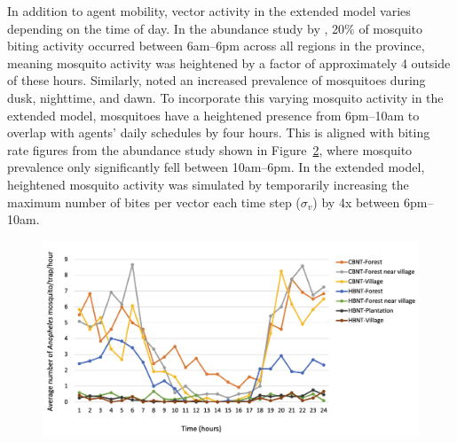 \begin{figure}[hbt!]
     \centering
    \label{fig:extended-model-scheduling}
\end{figure}

In addition to agent mobility, vector activity in the extended model varies depending on the time of day. In the abundance study by \citet{sandfort_forest_2020}, 20\% of mosquito biting activity occurred between 6am--6pm across all regions in the province, meaning mosquito activity was heightened by a factor of approximately 4 outside of these hours. Similarly, \citet{pepey_mobility_2022} noted an increased prevalence of mosquitoes during dusk, nighttime, and dawn. To incorporate this varying mosquito activity in the extended model, mosquitoes have a heightened presence from 6pm--10am to overlap with agents' daily schedules by four hours. This is aligned with biting rate figures from the abundance study shown in Figure~\ref{ch4:biting-rate-abundance}, where mosquito prevalence only significantly fell between 10am--6pm. In the extended model, heightened mosquito activity was simulated by temporarily increasing the maximum number of bites per vector each time step ($\sigma_v$) by 4x between 6pm--10am.


\begin{figure}[hbt!]
     \centering
     \includegraphics[width=1.1\textwidth]{figures/ch4/vantuax_fig2.png}
    \label{ch4:biting-rate-abundance}
\end{figure}

